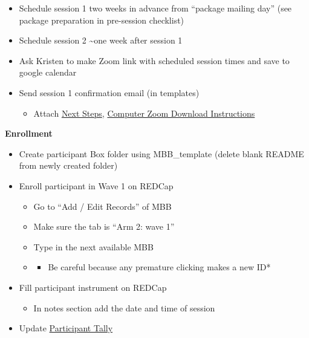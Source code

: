 \documentclass[]{book}
\providecommand{\tightlist}{%
  \setlength{\itemsep}{0pt}\setlength{\parskip}{0pt}}
\begin{document}
\begin{itemize}
\tightlist
\item
  Schedule session 1 two weeks in advance from ``package mailing day'' (see package preparation in pre-session checklist)
\item
  Schedule session 2 \textasciitilde{}one week after session 1
\item
  Ask Kristen to make Zoom link with scheduled session times and save to google calendar
\item
  Send session 1 confirmation email (in templates)

  \begin{itemize}
  \tightlist
  \item
    Attach \href{https://ucla.app.box.com/file/665452959932}{Next Steps}, \href{https://ucla.app.box.com/file/680632734387}{Computer Zoom Download Instructions}
  \end{itemize}
\end{itemize}

\textbf{Enrollment}

\begin{itemize}
\tightlist
\item
  Create participant Box folder using MBB\_template (delete blank README from newly created folder)
\item
  Enroll participant in Wave 1 on REDCap

  \begin{itemize}
  \item
    Go to ``Add / Edit Records'' of MBB
  \item
    Make sure the tab is ``Arm 2: wave 1''
  \item
    Type in the next available MBB
  \item
    \begin{itemize}
    \tightlist
    \item
      Be careful because any premature clicking makes a new ID*
    \end{itemize}
  \end{itemize}
\item
  Fill participant instrument on REDCap

  \begin{itemize}
  \tightlist
  \item
    In notes section add the date and time of session
  \end{itemize}
\item
  Update \href{https://ucla.app.box.com/file/724688028024}{Participant Tally}
\end{itemize}
\end{document}

